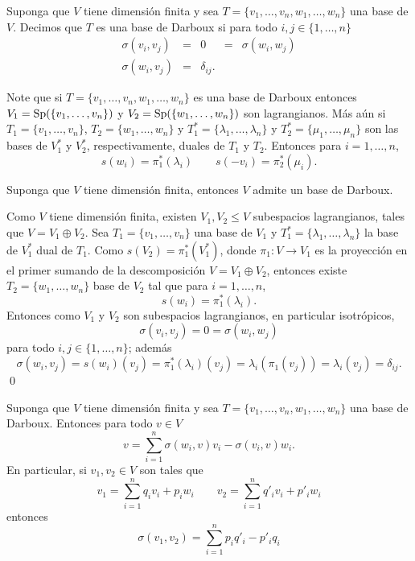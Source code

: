 \begin{defn}
Suponga que $V$ tiene dimensi\'on finita y sea $T=\{v_1,\ldots,v_n,w_1,\ldots,w_n\}$ una base de $V$. Decimos que $T$ es una base de Darboux si para todo $i,j\in\{1,\ldots,n\}$
\[
\begin{array}{rcccl}
\sigma(v_i,v_j) & = & 0 & = & \sigma(w_i,w_j)\\
\sigma(w_i,v_j) & = &\delta_{ij}.
\end{array}
\]
\end{defn}

\begin{obs}
Note que si $T=\{v_1,\ldots,v_n,w_1,\ldots,w_n\}$ es una base de Darboux entonces $V_1=\operatorname{Sp}(\{v_1,\ldots,v_n\})$ y $V_2=\operatorname{Sp}(\{w_1,\ldots,w_n\})$ son lagrangianos. M\'as a\'un si $T_1=\{v_1,\ldots,v_n\}$, $T_2=\{w_1,\ldots,w_n\}$ y $T_1^*=\{\lambda_1,\ldots,\lambda_n\}$ y $T_2^*=\{\mu_1,\ldots,\mu_n\}$ son las bases de $V_1^*$ y $V_2^*$, respectivamente, duales de $T_1$ y $T_2$. Entonces para $i=1,\ldots,n$,
\[
s(w_i)=\pi_1^*(\lambda_i)\qquad s(-v_i)=\pi_2^*(\mu_i).
\]
\end{obs}

\begin{teo}
Suponga que $V$ tiene dimensi\'on finita, entonces $V$ admite un base de Darboux.
\end{teo}

\dem Como $V$ tiene dimensi\'on finita, existen $V_1,V_2\le V$ subespacios lagrangianos, tales que $V=V_1\oplus V_2$. Sea $T_1=\{v_1,\ldots,v_n\}$ una base de $V_1$ y $T_1^*=\{\lambda_1,\ldots,\lambda_n\}$ la base de $V_1^*$ dual de $T_1$. Como $s(V_2)=\pi_1^*(V_1^*)$, donde $\pi_1:V\rightarrow V_1$ es la proyecci\'on en el primer sumando de la descomposici\'on $V=V_1\oplus V_2$, entonces existe $T_2=\{w_1,\ldots,w_n\}$ base de $V_2$ tal que para $i=1,\ldots,n$,
\[
s(w_i)=\pi_1^*(\lambda_i).
\]
Entonces como $V_1$ y $V_2$ son subespacios lagrangianos, en particular isotr\'opicos,
\[
\sigma(v_i,v_j) =  0  =  \sigma(w_i,w_j)
\]
para todo $i,j\in\{1,\ldots,n\}$; adem\'as
\[
\sigma(w_i,v_j)=s(w_i)(v_j)=\pi_1^*(\lambda_i)(v_j)=\lambda_i\left(\pi_1(v_j)\right)=\lambda_i(v_j)=\delta_{ij}.
\]
\qed

\begin{pro}\label{coorsimp}
Suponga que $V$ tiene dimensi\'on finita y sea $T=\{v_1,\ldots,v_n,w_1,\ldots,w_n\}$ una base de Darboux. Entonces para todo $v\in V$
\[
v=\sum_{i=1}^n\sigma(w_i,v)v_i-\sigma(v_i,v)w_i.
\]
En particular, si $v_1,v_2\in V$ son tales que
\[
v_1=\sum_{i=1}^nq_iv_i+p_iw_i \qquad v_2=\sum_{i=1}^nq'_iv_i+p'_iw_i
\]
entonces
\[
\sigma(v_1,v_2)=\sum_{i=1}^np_iq'_i-p'_iq_i
\]
\end{pro}

